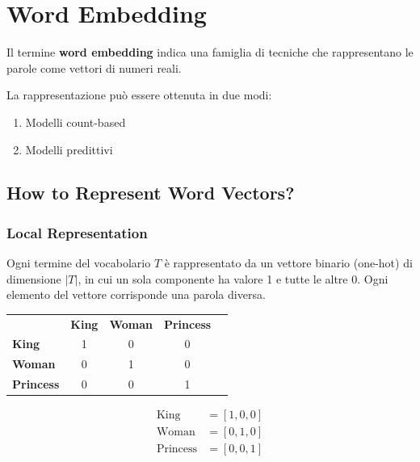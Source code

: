 \chapter{Word Embedding}
Il termine \textbf{word embedding} indica una famiglia di tecniche che rappresentano le parole come vettori di numeri reali.

La rappresentazione può essere ottenuta in due modi:
\begin{enumerate}
  \item Modelli count-based
  \item Modelli predittivi
\end{enumerate}

\section{How to Represent Word Vectors?}

\subsection*{Local Representation}
Ogni termine del vocabolario $T$ è rappresentato da un vettore binario (one-hot) di dimensione $|T|$, in cui un sola componente ha valore 1 e tutte le altre 0.
Ogni elemento del vettore corrisponde una parola diversa.

\begin{minipage}[c]{0.6\linewidth}
  \begin{tabular}{l c c c c}
                                    & {\color{red} \textbf{King}} & {\color{red} \textbf{Woman}} & {\color{red} \textbf{Princess}} \\
    {\color{red} \textbf{King}}     & 1                           & 0                            & 0                               \\
    {\color{red} \textbf{Woman}}    & 0                           & 1                            & 0                               \\
    {\color{red} \textbf{Princess}} & 0                           & 0                            & 1
  \end{tabular}
\end{minipage}
\hfill
\begin{minipage}[c]{0.3\linewidth}
  \begin{align*}
    \text{King}     & = [1, 0, 0] \\
    \text{Woman}    & = [0, 1, 0] \\
    \text{Princess} & = [0, 0, 1]
  \end{align*}
\end{minipage}
\bigskip

